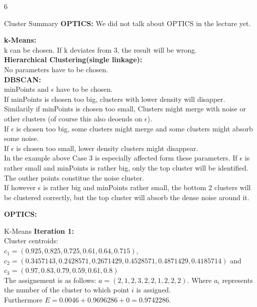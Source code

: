 \documentclass{article}
\begin{document}
\begin{ukon-infie}[5.12.17]{6}
\begin{exercise}[p=7]{Cluster Summary}
{      	\textbf{OPTICS:}
      	We did not talk about OPTICS in the lecture yet.
       }
              
       \question{}
       {
       \textbf{k-Means:}\\
       k can be chosen. If k deviates from 3, the result will be wrong.\\
       
       \textbf{Hierarchical Clustering(single linkage):}\\
       No parameters have to be chosen.\\
       
       
       \textbf{DBSCAN:}\\
		minPoints and $\epsilon$ have to be chosen.\\
		If minPoints is chosen too big, clusters with lower density will disapper.\\
		Similarily if minPoints is chosen too small, Clusters might merge with noise or other clusters (of course this also deoends on $\epsilon$).\\
		If $\epsilon$ is chosen too big, some clusters might merge and some clusters might absorb some noise.\\
		If $\epsilon$ is chosen too small, lower density clusters might disappear.\\
		In the example above Case 3 is especially affected form these parameters. If $\epsilon$ is rather small and minPoints is rather big, only the top cluster will be identified. The outher points constitue the noise cluster.\\
		If however $\epsilon$ is rather big and minPoints rather small, the bottom 2 clusters will be clustered correctly, but the top cluster will absorb the dense noise around it.
		
       
       \textbf{OPTICS:}\\
       }
       

		\end{exercise}
		
		\begin{exercise}[p=10]{K-Means}
		\textbf{Iteration 1:}\\
		Cluster centroids: \\
		$c_1 = (0.925, 0.825, 0.725, 0.61, 0.64, 0.715)$, \\
		$c_2 = (0.3457143, 0.2428571, 0.2671429, 0.4528571, 0.4871429, 0.4185714)$ and \\
		$c_3 = (0.97, 0.83, 0.79, 0.59, 0.61, 0.8)$\\
		The assignement is as follows: $a = (2,1,2,3,2,2,1,2,2,2)$. Where $a_i$ represents the number of the cluster to which point $i$ is assigned.\\
		Furthermore  $E = 0.0046 + 0.9696286 + 0 = 0.9742286$.\\
		

\end{exercise}
\end{ukon-infie}
\end{document}
